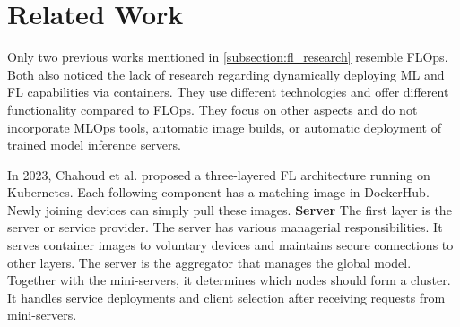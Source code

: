 \section{Related Work}

Only two previous works \cite{paper:fl_toward_on_demand_client_deployment_at_edge, paper:global_fl_platform_for_iot} mentioned in \ref{subsection:fl_research} resemble FLOps.
Both also noticed the lack of research regarding dynamically deploying ML and FL capabilities via containers.
They use different technologies and offer different functionality compared to FLOps.
They focus on other aspects and do not incorporate MLOps tools, automatic image builds, or automatic deployment of trained model inference servers.

In 2023, Chahoud et al. \cite{paper:fl_toward_on_demand_client_deployment_at_edge} proposed a three-layered FL architecture running on Kubernetes.
Each following component has a matching image in DockerHub.
Newly joining devices can simply pull these images.
\vspace{5mm}
\newline
\textbf{Server}\newline
The first layer is the server or service provider.
The server has various managerial responsibilities.
It serves container images to voluntary devices and maintains secure connections to other layers.
The server is the aggregator that manages the global model.
Together with the mini-servers, it determines which nodes should form a cluster.
It handles service deployments and client selection after receiving requests from mini-servers.

